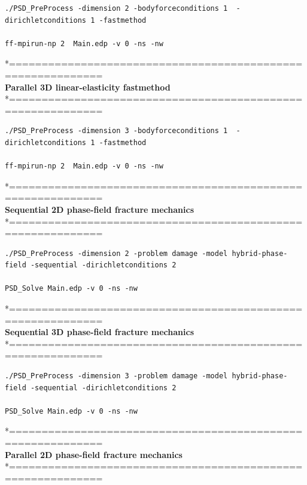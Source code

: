 \documentclass{report}
\begin{document}
\begin{lstlisting}[style=Linux]
./PSD_PreProcess -dimension 2 -bodyforceconditions 1  -dirichletconditions 1 -fastmethod  

ff-mpirun-np 2  Main.edp -v 0 -ns -nw	
\end{lstlisting}
*============================================================\\
\textbf{ Parallel 3D linear-elasticity     fastmethod }             \\
*============================================================\\
	
\begin{lstlisting}[style=Linux]
./PSD_PreProcess -dimension 3 -bodyforceconditions 1  -dirichletconditions 1 -fastmethod  

ff-mpirun-np 2  Main.edp -v 0 -ns -nw
\end{lstlisting}



*============================================================\\
\textbf{ Sequential  2D phase-field fracture mechanics }\\
*============================================================\\
\begin{lstlisting}[style=Linux]
./PSD_PreProcess -dimension 2 -problem damage -model hybrid-phase-field -sequential -dirichletconditions 2   

PSD_Solve Main.edp -v 0 -ns -nw   
\end{lstlisting}
*============================================================\\
\textbf{ Sequential  3D phase-field fracture mechanics}\\ 
*============================================================\\

\begin{lstlisting}[style=Linux]
./PSD_PreProcess -dimension 3 -problem damage -model hybrid-phase-field -sequential -dirichletconditions 2   

PSD_Solve Main.edp -v 0 -ns -nw   
\end{lstlisting}
*============================================================\\
\textbf{ Parallel 2D phase-field fracture mechanics} \\
*============================================================\\
\end{document}
